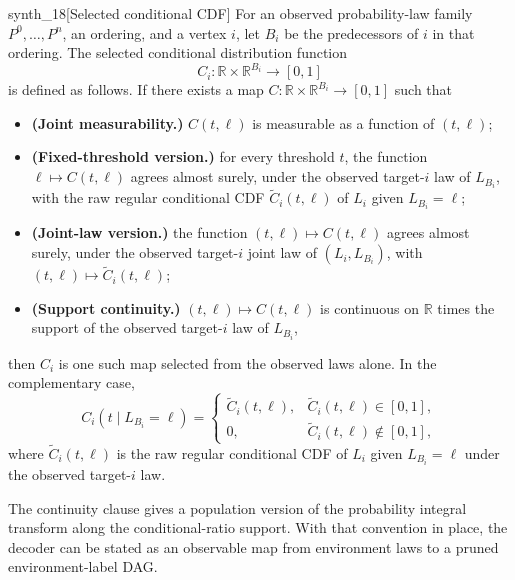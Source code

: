 \documentclass[11pt]{article}
\begin{document}
\begin{definitionv}{synth_18}[Selected conditional CDF]
For an observed probability-law family \(P^0,\ldots,P^n\), an ordering, and a vertex \(i\), let \(B_i\) be the predecessors of \(i\) in that ordering. The selected conditional distribution function
\[
C_i:\mathbb R\times\mathbb R^{B_i}\to[0,1]
\]
is defined as follows. If there exists a map \(C:\mathbb R\times\mathbb R^{B_i}\to[0,1]\) such that
\begin{itemize}
\item \textbf{(Joint measurability.)} \(C(t,\ell)\) is measurable as a function of \((t,\ell)\);
\item \textbf{(Fixed-threshold version.)} for every threshold \(t\), the function \(\ell\mapsto C(t,\ell)\) agrees almost surely, under the observed target-\(i\) law of \(L_{B_i}\), with the raw regular conditional CDF \(\widetilde C_i(t,\ell)\) of \(L_i\) given \(L_{B_i}=\ell\);
\item \textbf{(Joint-law version.)} the function \((t,\ell)\mapsto C(t,\ell)\) agrees almost surely, under the observed target-\(i\) joint law of \((L_i,L_{B_i})\), with \((t,\ell)\mapsto\widetilde C_i(t,\ell)\);
\item \textbf{(Support continuity.)} \((t,\ell)\mapsto C(t,\ell)\) is continuous on \(\mathbb R\) times the support of the observed target-\(i\) law of \(L_{B_i}\),
\end{itemize}
then \(C_i\) is one such map selected from the observed laws alone. In the complementary case,
\[
C_i(t\mid L_{B_i}=\ell)=
\begin{cases}
\widetilde C_i(t,\ell), & \widetilde C_i(t,\ell)\in[0,1],\\
0, & \widetilde C_i(t,\ell)\notin[0,1],
\end{cases}
\]
where \(\widetilde C_i(t,\ell)\) is the raw regular conditional CDF of \(L_i\) given \(L_{B_i}=\ell\) under the observed target-\(i\) law.
\end{definitionv}

The continuity clause gives a population version of the probability integral transform along the conditional-ratio support. With that convention in place, the decoder  can be stated as an observable map from environment laws to a pruned environment-label DAG.
\end{document}

